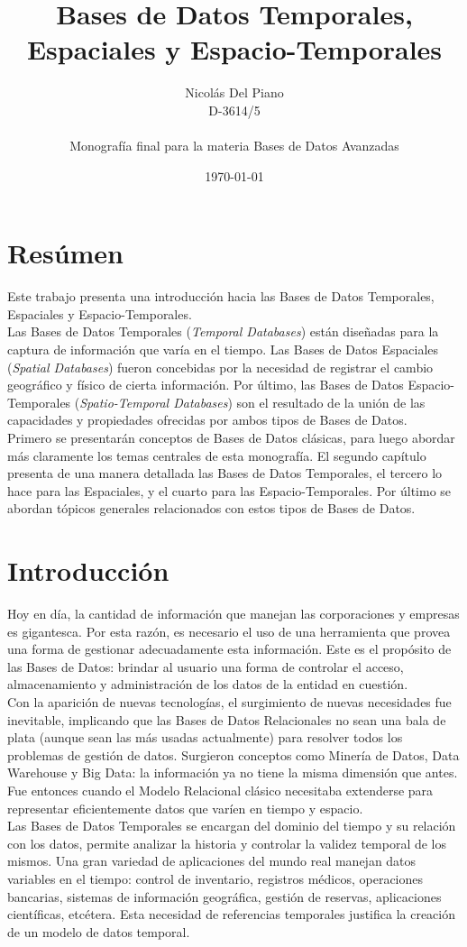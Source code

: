 \documentclass[a4paper,12pt,oneside]{report}
\title{Bases de Datos Temporales, Espaciales y Espacio-Temporales}
\date{\today}
\author{Nicol\'as Del Piano\\D-3614/5\\
\ \\
Monograf\'ia final para la materia Bases de Datos Avanzadas
}
\date{}
\newcommand{\mychapter}[2]{
    \setcounter{chapter}{#1}
    \setcounter{section}{0}
    \chapter*{#2}
    \addcontentsline{toc}{chapter}{#2}
}
\begin{document}
\maketitle
\tableofcontents
\newpage

\mychapter{0}{Res\'umen}
Este trabajo presenta una introducci\'on hacia las Bases de Datos Temporales, Espaciales y Espacio-Temporales.\\Las Bases de Datos Temporales (\textit{Temporal Databases}) est\'an dise\~nadas para la captura de informaci\'on que var\'ia en el tiempo. Las Bases de Datos Espaciales (\textit{Spatial Databases}) fueron concebidas por la necesidad de registrar el cambio geogr\'afico y f\'isico de cierta informaci\'on. Por \'ultimo, las Bases de Datos Espacio-Temporales (\textit{Spatio-Temporal Databases}) son el resultado de la uni\'on de las capacidades y propiedades ofrecidas por ambos tipos de Bases de Datos.\\Primero se presentar\'an conceptos de Bases de Datos cl\'asicas, para luego abordar m\'as claramente los temas centrales de esta monograf\'ia. El segundo cap\'itulo presenta de una manera detallada las Bases de Datos Temporales, el tercero lo hace para las Espaciales, y el cuarto para las Espacio-Temporales. Por \'ultimo se abordan t\'opicos generales relacionados con estos tipos de Bases de Datos.
\mychapter{1}{Introducci\'on}
Hoy en d\'ia, la cantidad de informaci\'on que manejan las corporaciones y empresas es gigantesca. Por esta raz\'on, es necesario el uso de una herramienta que provea una forma de gestionar adecuadamente esta informaci\'on. Este es el prop\'osito de las Bases de Datos: brindar al usuario una forma de controlar el acceso, almacenamiento y administraci\'on de los datos de la entidad en cuesti\'on.\\
Con la aparici\'on de nuevas tecnolog\'ias, el surgimiento de nuevas necesidades fue inevitable, implicando que las Bases de Datos Relacionales no sean una bala de plata (aunque sean las m\'as usadas actualmente) para resolver todos los problemas de gesti\'on de datos. Surgieron conceptos como Miner\'ia de Datos, Data Warehouse y Big Data: la informaci\'on ya no tiene la misma dimensi\'on que antes. Fue entonces cuando el Modelo Relacional cl\'asico necesitaba extenderse para representar eficientemente datos que var\'ien en tiempo y espacio.\\
Las Bases de Datos Temporales se encargan del dominio del tiempo y su relaci\'on con los datos, permite analizar la historia y controlar la validez temporal de los mismos. Una gran variedad de aplicaciones del mundo real manejan datos variables en el tiempo: control de inventario, registros m\'edicos, operaciones bancarias, sistemas de informaci\'on geogr\'afica, gesti\'on de reservas, aplicaciones cient\'ificas, etc\'etera. Esta necesidad de referencias temporales justifica la creaci\'on de un modelo de datos temporal.\\
\end{document}
